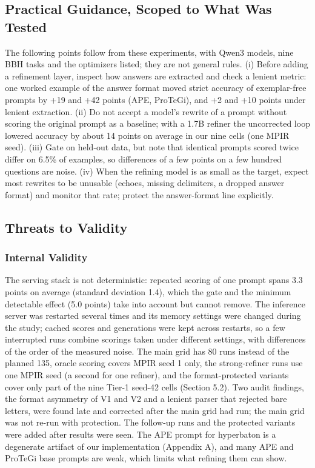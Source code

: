 \documentclass{ieeeaccess}
\begin{document}
\subsection{Practical Guidance, Scoped to What Was Tested}

The following points follow from these experiments, with Qwen3 models, nine BBH tasks and the optimizers listed; they are not general rules. (i) Before adding a refinement layer, inspect how answers are extracted and check a lenient metric: one worked example of the answer format moved strict accuracy of exemplar-free prompts by +19 and +42 points (APE, ProTeGi), and +2 and +10 points under lenient extraction. (ii) Do not accept a model's rewrite of a prompt without scoring the original prompt as a baseline; with a 1.7B refiner the uncorrected loop lowered accuracy by about 14 points on average in our nine cells (one MPIR seed). (iii) Gate on held-out data, but note that identical prompts scored twice differ on 6.5\% of examples, so differences of a few points on a few hundred questions are noise. (iv) When the refining model is as small as the target, expect most rewrites to be unusable (echoes, missing delimiters, a dropped answer format) and monitor that rate; protect the answer-format line explicitly.

\subsection{Threats to Validity}

\subsubsection{Internal Validity}

The serving stack is not deterministic: repeated scoring of one prompt spans 3.3 points on average (standard deviation 1.4), which the gate and the minimum detectable effect (5.0 points) take into account but cannot remove. The inference server was restarted several times and its memory settings were changed during the study; cached scores and generations were kept across restarts, so a few interrupted runs combine scorings taken under different settings, with differences of the order of the measured noise. The main grid has 80 runs instead of the planned 135, oracle scoring covers MPIR seed 1 only, the strong-refiner runs use one MPIR seed (a second for one refiner), and the format-protected variants cover only part of the nine Tier-1 seed-42 cells (Section 5.2). Two audit findings, the format asymmetry of V1 and V2 and a lenient parser that rejected bare letters, were found late and corrected after the main grid had run; the main grid was not re-run with protection. The follow-up runs and the protected variants were added after results were seen. The APE prompt for hyperbaton is a degenerate artifact of our implementation (Appendix A), and many APE and ProTeGi base prompts are weak, which limits what refining them can show.
\end{document}
